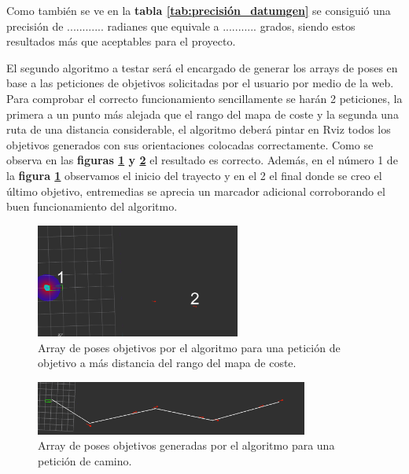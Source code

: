 Como también se ve en la \textbf{tabla \ref{tab:precisión_datumgen}} se consiguió una precisión de ............ radianes que equivale a ........... grados, siendo estos resultados más que aceptables 
para el proyecto.

El segundo algoritmo a testar será el encargado de generar los arrays de poses en base a las peticiones de objetivos solicitadas por el usuario por medio de 
la web. Para comprobar el correcto funcionamiento sencillamente se harán 2 peticiones, la primera a un punto más alejada que el rango del mapa de coste y la segunda una ruta de una distancia considerable, el algoritmo deberá pintar en Rviz 
todos los objetivos generados con sus orientaciones colocadas correctamente. Como se observa en las 
\textbf{figuras \ref{fig:puntos_intermedios_mas_50m} y \ref{fig:puntos_intermedios_camino}} el resultado es correcto. Además, en el número 1 de la \textbf{figura \ref{fig:puntos_intermedios_mas_50m}} 
observamos el inicio del trayecto y en el 2 el final donde se creo el último objetivo, entremedias se aprecia un marcador adicional corroborando el buen funcionamiento del algoritmo.
\begin{figure}[H]
    \centering
    \includegraphics[width=0.6\textwidth]{images/punto_alejado.png}
    \caption{Array de poses objetivos por el algoritmo para una petición de objetivo a más distancia del rango del mapa de coste.}
    \label{fig:puntos_intermedios_mas_50m}
\end{figure}

\begin{figure}[H]
    \centering
    \includegraphics[width=0.8\textwidth]{images/camino_punto_inter.png}
    \caption{Array de poses objetivos generadas por el algoritmo para una petición de camino.}
    \label{fig:puntos_intermedios_camino}
\end{figure}

